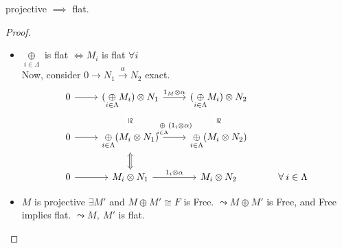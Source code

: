 \begin{prop}
  projective $\implies$ flat.
  \begin{proof} $ $
    \begin{itemize}
      \item $\underset{i \in \Lambda}{\oplus}$ is flat $\iff M_i$ is 
        flat $\forall i$ \\
        Now, consider $0 \to N_1 \overset{\alpha}{\to} N_2$ exact.
        $$
          \begin{tikzcd} [cong/.style = {draw=none, 
        "\cong" description, sloped}]
            0 \ar[r] & (\underset{i \in \Lambda}{\oplus} M_i) \otimes 
            N_1 \ar[r, "1_M \otimes \alpha"] \ar[d,cong] & 
            (\underset{i \in \Lambda}{\oplus} M_i) \otimes 
            N_2 \ar[d, cong] \\ 
            0 \ar[r] & \underset{i \in \Lambda}{\oplus}(M_i \otimes N_1)
            \ar[r, "\underset{i \in \Lambda}{\oplus}(1_i \otimes 
            \alpha)"] \ar[d, Leftrightarrow]& \underset{i \in \Lambda}
            {\oplus}(M_i \otimes N_2)\\
            0 \ar[r] & M_i \otimes N_1 \ar[r, "1_i \otimes \alpha"] 
            & M_i \otimes N_2 & \forall i \in \Lambda 
          \end{tikzcd}
        $$
      \item $M$ is projective $\exists M'$ and $M \oplus M' \cong
        F$ is Free. $\leadsto M \oplus M'$ is Free, and Free implies
         flat. $\leadsto M,\ M'$ is flat.
    \end{itemize}
  \end{proof}
\end{prop}



